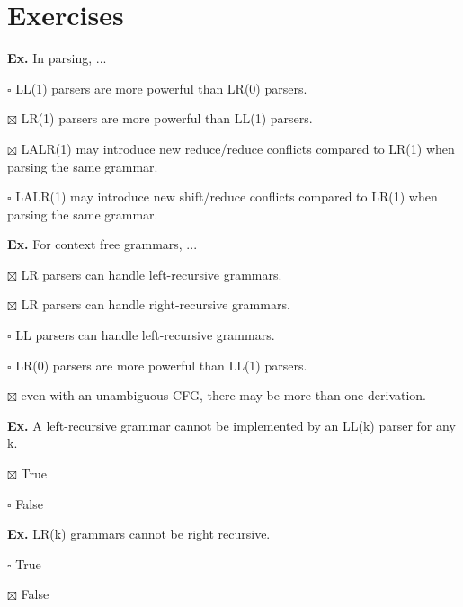 \section*{Exercises}

\hrulefill

\textbf{Ex.} In parsing, ...
\begin{compactitem}
	\item[$\square$] LL(1) parsers are more powerful than LR(0) parsers.
	\item[$\boxtimes$] LR(1) parsers are more powerful than LL(1) parsers.
	\item[$\boxtimes$] LALR(1) may introduce new reduce/reduce conflicts compared to LR(1) when parsing the same grammar.
	\item[$\square$] LALR(1) may introduce new shift/reduce conflicts compared to LR(1) when parsing the same grammar.
\end{compactitem}

\hrulefill

\textbf{Ex.} For context free grammars, ...
\begin{compactitem}
	\item[$\boxtimes$] LR parsers can handle left-recursive grammars.
	\item[$\boxtimes$] LR parsers can handle right-recursive grammars.
	\item[$\square$] LL parsers can handle left-recursive grammars.
	\item[$\square$] LR(0) parsers are more powerful than LL(1) parsers.
	\item[$\boxtimes$] even with an unambiguous CFG, there may be more than one derivation.
\end{compactitem}

\hrulefill

\textbf{Ex.} A left-recursive grammar cannot be implemented by an LL(k) parser for any k.
\begin{compactitem}
	\item[$\boxtimes$] True
	\item[$\square$] False
\end{compactitem}

\hrulefill

\textbf{Ex.} LR(k) grammars cannot be right recursive.
\begin{compactitem}
	\item[$\square$] True
	\item[$\boxtimes$] False
\end{compactitem}

